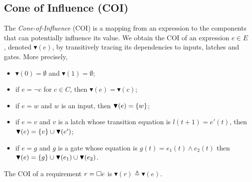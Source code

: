 \subsection{Cone of Influence (COI)}
The \emph{Cone-of-Influence} (COI) is a mapping from an expression to the components that can potentially influence its value. We obtain the COI of an expression $e \in E$, denoted $\blacktriangledown(e)$, by transitively tracing its dependencies to inputs, latches and gates. More precisely, 
\begin{itemize}
\item $\blacktriangledown(0)=\emptyset$ and $\blacktriangledown(1)=\emptyset$;
\item if $e=\lnot c$ for $c \in C$, then $\blacktriangledown(e)= \blacktriangledown(c)$;
\item if $e=w$ and $w$ is an input, then $\blacktriangledown(e)=\left\{w\right\}$;
\item if $e=v$ and $v$ is a latch whose transition equation is $l(t+1) = e'(t)$, then $\blacktriangledown(e)=\left\{v\right\} \cup \blacktriangledown(e')$;
\item if $e=g$ and $g$ is a gate whose equation is $g(t) = e_1(t) \land e_2(t)$ then $\blacktriangledown(e)=\left\{g\right\} \cup \blacktriangledown(e_1)\cup \blacktriangledown(e_2)$.
\end{itemize}
The COI of a requirement $r={{\square}} e$ is $\blacktriangledown(r)\triangleq \blacktriangledown(e)$.

